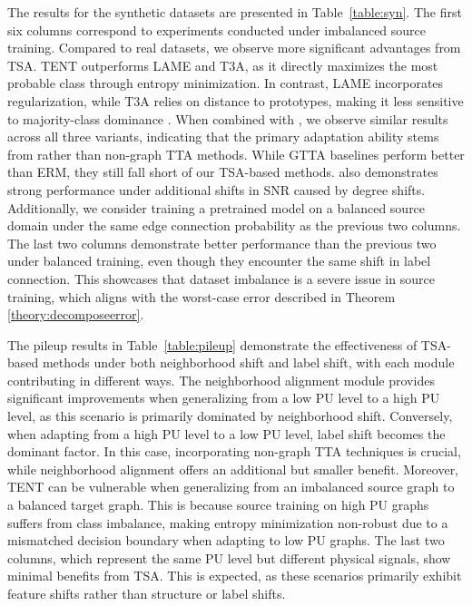The results for the synthetic datasets are presented in Table~\ref{table:syn}.
The first six columns correspond to experiments conducted under imbalanced source training.
Compared to real datasets, we observe more significant advantages from TSA. TENT outperforms LAME and T3A, as it directly maximizes the most probable class through entropy minimization. In contrast, LAME incorporates regularization, while T3A relies on distance to prototypes, making it less sensitive to majority-class dominance \cite{zhang2022divide}. When combined with \proj, we observe similar results across all three variants, indicating that the primary adaptation ability stems from \proj rather than non-graph TTA methods. While GTTA baselines perform better than ERM, they still fall short of our TSA-based methods. \proj also demonstrates strong performance under additional shifts in SNR caused by degree shifts. 
Additionally, we consider training a pretrained model on a balanced source domain under the same edge connection probability as the previous two columns.
The last two columns demonstrate better performance than the previous two under balanced training, even though they encounter the same shift in label connection.
This showcases that dataset imbalance is a severe issue in source training, which aligns with the worst-case error described in Theorem \ref{theory:decomposeerror}. 

The pileup results in Table~\ref{table:pileup} demonstrate the effectiveness of TSA-based methods under both neighborhood shift and label shift, with each module contributing in different ways. The neighborhood alignment module provides significant improvements when generalizing from a low PU level to a high PU level, as this scenario is primarily dominated by neighborhood shift. Conversely, when adapting from a high PU level to a low PU level, label shift becomes the dominant factor. In this case, incorporating non-graph TTA techniques is crucial, while neighborhood alignment offers an additional but smaller benefit. Moreover, TENT can be vulnerable when generalizing from an imbalanced source graph to a balanced target graph. 
This is because source training on high PU graphs suffers from class imbalance, making entropy minimization non-robust due to a mismatched decision boundary when adapting to low PU graphs. The last two columns, which represent the same PU level but different physical signals, show minimal benefits from TSA. This is expected, as these scenarios primarily exhibit feature shifts rather than structure or label shifts.

